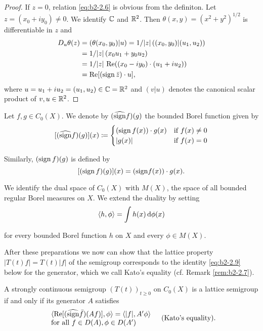 \begin{proof}
If $z = 0$, relation \eqref{eq:b2-2.6} is obvious from the definiton.
Let $z = (x_{0} + iy_{0}) \neq 0$.
We identify $\mathbb{C}$ and $\mathbb{R}^2$.
Then $\theta(x,y) = (x^2 + y^2)^{1/2}$ is differentiable in $z$ and
\begin{align*}
D_{u}\theta(z) &= (\theta(x_{0},y_{0})|u) = 1/|z|\, ((x_{0},y_{0})|(u_{1},u_{2}))  \\
               &= 1/|z|\, (x_{0}u_{1} + y_{0}u_{2}) \\
               &= 1/|z|\, \mathop{}\!\mathrm{Re}((x_{0}-iy_{0})\cdot(u_{1}+iu_{2})) \\
               &= \mathop{}\!\mathrm{Re}[(\operatorname{sign} \bar{z})\cdot u],
\end{align*}
where $u = u_{1} + iu_{2} = (u_{1},u_{2}) \in \mathbb{C} = \mathbb{R}^2$ and $(v|u)$ denotes the canonical scalar product of $v,u \in \mathbb{R}^2$.
\end{proof}

Let $f, g \in C_{0}(X)$.
We denote by $(\widehat{\operatorname{sign}} f)(g)$ the bounded Borel function given by
\begin{equation}\label{eq:b2-2.7}
[(\widehat{\operatorname{sign}} f)(g)](x) \coloneqq \begin{cases}
    (\operatorname{sign} f(x))\cdot g(x) & \text{if } f(x) \neq 0 \\
    |g(x)| & \text{if } f(x) = 0
\end{cases}
\end{equation}

Similarly, $(\operatorname{sign} f)(g)$ is defined by
\begin{equation}\label{eq:b2-2.8}
[(\operatorname{sign} f)(g)](x) = ({\operatorname{sign}} f(x))\cdot g(x).
\end{equation}

We identify the dual space of $C_{0}(X)$ with $M(X)$, the space of all bounded regular Borel measures on $X$.
We extend the duality by setting
\begin{equation*}
\langle h,\phi \rangle = \int h(x)   \mathop{}\!\mathrm{d}{\phi}(x)
\end{equation*}

for every bounded Borel function $h$ on $X$ and every $\phi \in M(X)$.

After these preparations we now can show that the lattice property $|T(t)f| = T(t)|f|$ of the semigroup corresponds to the identity \eqref{eq:b2-2.9} below for the generator, which we call Kato's equality (cf. Remark \ref{rem:b2-2.7}).

\begin{theorem}\label{thm:b2-2.5}
A strongly continuous semigroup $(T(t))_{t \geq 0}$ on $C_{0}(X)$ is a lattice semigroup if and only if its generator $A$ satisfies
\begin{equation}\label{eq:b2-2.9}
\begin{array}{l}
\langle \mathop{}\!\mathrm{Re}[(\widehat{\operatorname{sign}} \bar{f})(Af)],\phi \rangle = \langle |f|,A'\phi \rangle \\
\text{for all } f \in D(A), \phi \in D(A') 
\end{array} \quad \text{(Kato's equality)}.
\end{equation}
\end{theorem}

